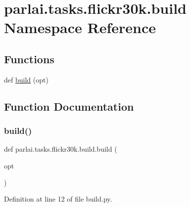 \hypertarget{namespaceparlai_1_1tasks_1_1flickr30k_1_1build}{}\section{parlai.\+tasks.\+flickr30k.\+build Namespace Reference}
\label{namespaceparlai_1_1tasks_1_1flickr30k_1_1build}
\subsection*{Functions}
\begin{DoxyCompactItemize}
\item 
def \hyperlink{namespaceparlai_1_1tasks_1_1flickr30k_1_1build_a45b58a1c8d68443baba41a4f9290967d}{build} (opt)
\end{DoxyCompactItemize}


\subsection{Function Documentation}
\mbox{\label{namespaceparlai_1_1tasks_1_1flickr30k_1_1build_a45b58a1c8d68443baba41a4f9290967d}} 
\subsubsection{\texorpdfstring{build()}{build()}}
{\footnotesize\ttfamily def parlai.\+tasks.\+flickr30k.\+build.\+build (\begin{DoxyParamCaption}\item[{}]{opt }\end{DoxyParamCaption})}



Definition at line 12 of file build.\+py.

